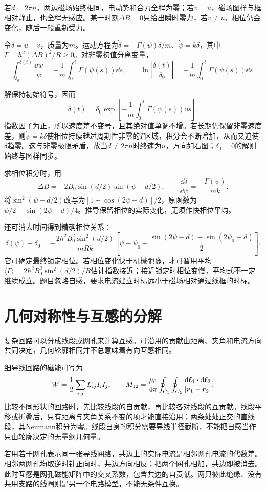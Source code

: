 \begin{solution}
若$d=2\pi n$，两边磁场始终相同，电动势和合力全程为零；若$v=u$，磁场图样与框相对静止，也全程无感应。某一时刻$\Delta B=0$只给出瞬时零力，若$v\ne u$，相位仍会变化，随后一般重新受力。

令$\delta=u-v$，质量为$m$。运动方程为$\dot\delta=-\Gamma(\psi)\delta/m$、$\dot\psi=k\delta$，其中$\Gamma=h^2(\Delta B)^2/R\ge0$。对非零初值分离变量，
\[\int_{\delta_0}^{\delta(t)}\frac{\dd w}{w}
=-\frac1m\int_0^t\Gamma(\psi(s))\dd s,
\qquad \ln\left|\frac{\delta(t)}{\delta_0}\right|
=-\frac1m\int_0^t\Gamma(\psi(s))\dd s.\]


解保持初始符号，因而
\[\delta(t)=\delta_0\exp\left[-\frac1m\int_0^t\Gamma(\psi(s))\dd s\right].\]
指数因子为正，所以速度差不变号，且其绝对值单调不增。若长期仍保留非零速度差，则$\dot\psi=k\delta$使相位持续越过周期性非零的$\Gamma$区域，积分会不断增加，从而又迫使$\delta$趋零。这与非零极限矛盾，故当$d\ne2\pi n$时终速为$u$，方向如右图；$\delta_0=0$的解则始终与图样同步。

求相位积分时，用
\[
\Delta B=-2B_0\sin(d/2)\sin(\psi-d/2),\qquad
\frac{\dd\delta}{\dd\psi}=-\frac{\Gamma(\psi)}{mk}.
\]
将$\sin^2(\psi-d/2)$改写为$[1-\cos(2\psi-d)]/2$，原函数为$\psi/2-\sin(2\psi-d)/4$。推导保留相位的实际变化，无须作快相位平均。


还可消去时间得到精确相位关系：
\[\delta(\psi)-\delta_0
=-\frac{2h^2B_0^2\sin^2(d/2)}{mRk}
\left[\psi-\psi_0-\frac{\sin(2\psi-d)-\sin(2\psi_0-d)}2\right].
\]
它可确定最终锁定相位。若相位变化快于机械弛豫，才可暂用平均$\langle\Gamma\rangle=2h^2B_0^2\sin^2(d/2)/R$估计指数接近；接近锁定时相位变慢，平均式不一定继续成立。题目忽略自感，要求电流建立时标远小于磁场相对通过线框的时标。
\end{solution}


\section{几何对称性与互感的分解}\label{sec:i3-geometry}
复杂回路可以分成线段或网孔来计算互感。可沿用的贡献由距离、夹角和电流方向共同决定，几何轮廓相同并不总意味着有向互感相同。

细导线回路的磁能可写为
\[
W=\frac12\sum_{i,j}L_{ij}I_iI_j,\qquad
M_{12}=\frac{\mu_0}{4\pi}\oint_{C_1}\oint_{C_2}
\frac{\mathop{}\!\mathrm d\bm{\ell}_1\cdot\mathop{}\!\mathrm d\bm{\ell}_2}{|\bm{r}_1-\bm{r}_2|}.
\]
比较不同形状的回路时，先比较线段的自贡献，再比较各对线段的互贡献。线段平移或折叠后，只有距离与夹角关系不变的项才能直接沿用；两条处处正交的直线段，其Neumann积分为零。线段自身的积分需要导线半径截断，不能把自感当作只由轮廓决定的无量纲几何量。

若用若干网孔表示同一张导线网络，共边上的实际电流是相邻网孔电流的代数差。相邻两网孔均取逆时针正向时，共边方向相反；把两个网孔相加，共边即被消去。此时互感是网孔磁能矩阵中的交叉系数，包含共边的自贡献。两只彼此绝缘、没有共用支路的线圈则是另一个电路模型，不能无条件互换。


